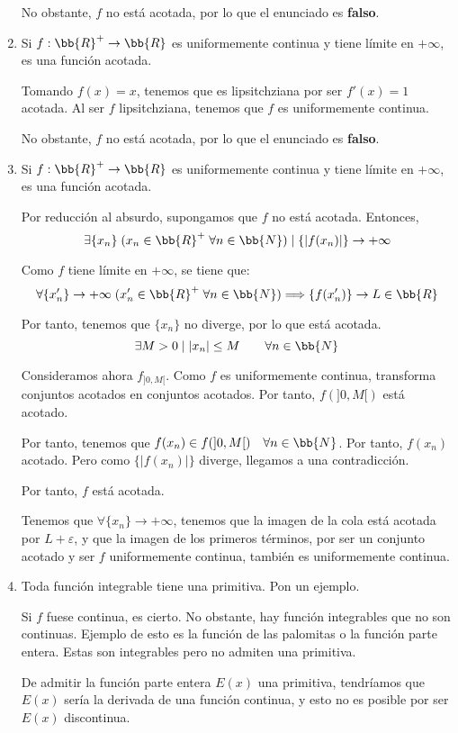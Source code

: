 \documentclass[12pt]{article}
\begin{document}
\begin{ejercicio}
\begin{enumerate}
        No obstante, $f$ no está acotada, por lo que el enunciado es \textbf{falso}.

        \item Si $f:\bb{R}^+\to \bb{R}$ es uniformemente continua y tiene límite en $+\infty$, es una función acotada.

        Tomando $f(x)=x$, tenemos que es lipsitchziana por ser $f'(x)=1$ acotada. Al ser $f$ lipsitchziana, tenemos que $f$ es uniformemente continua.

        No obstante, $f$ no está acotada, por lo que el enunciado es \textbf{falso}.

        \item Si $f:\bb{R}^+\to \bb{R}$ es uniformemente continua y tiene límite en $+\infty$, es una función acotada.

        Por reducción al absurdo, supongamos que $f$ no está acotada. Entonces, $$\exists \{x_n\}\;(x_n\in \bb{R}^+\;\forall n\in \bb{N}) \mid \{|f(x_n)|\}\to +\infty$$

        Como $f$ tiene límite en $+\infty$, se tiene que: $$\forall \{x_n'\}\to +\infty\;(x_n'\in \bb{R}^+\;\forall n\in \bb{N}) \Longrightarrow \{f(x_n')\}\to L\in \bb{R}$$

        Por tanto, tenemos que $\{x_n\}$ no diverge, por lo que está acotada.
        \begin{equation*}
            \exists M>0 \mid |x_n|\leq M \qquad \forall n\in \bb{N}
        \end{equation*}

        Consideramos ahora $f_{]0,M[}$. Como $f$ es uniformemente continua, transforma conjuntos acotados en conjuntos acotados. Por tanto, $f(]0,M[)$ está acotado.

        Por tanto, tenemos que $f(x_n)\in f(]0,M[) \quad \forall n\in \bb{N}$. Por tanto, $f(x_n)$ acotado. Pero como $\{|f(x_n)|\}$ diverge, llegamos a una contradicción.

        Por tanto, $f$ está acotada.

        \begin{observacion}
            Tenemos que $\forall \{x_n\}\to +\infty$, tenemos que la imagen de la cola está acotada por $L+\varepsilon$, y que la imagen de los primeros términos, por ser un conjunto acotado y ser $f$ uniformemente continua, también es uniformemente continua.
        \end{observacion}
        

        \item Toda función integrable tiene una primitiva. Pon un ejemplo.

        Si $f$ fuese continua, es cierto. No obstante, hay función integrables que no son continuas. Ejemplo de esto es la función de las palomitas o la función parte entera. Estas son integrables pero no admiten una primitiva.

        De admitir la función parte entera $E(x)$ una primitiva, tendríamos que $E(x)$ sería la derivada de una función continua, y esto no es posible por ser $E(x)$ discontinua.
    \end{enumerate}
\end{ejercicio}
\end{document}
